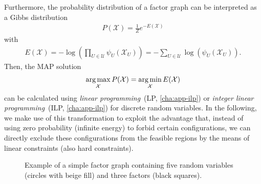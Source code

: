 Furthermore, the probability distribution of a factor graph can be interpreted as a Gibbs
distribution
\begin{align}
    \label{fg-gibbs}
    P(\mathcal{X}) = \frac{1}{Z}e^{-E(\mathcal{X})}
\end{align}
with
\begin{align}
    E(\mathcal{X}) = -\log\left(\prod_{U \in \mathcal{U}}\psi_U(\mathcal{X}_U)\right) = -\sum_{U \in \mathcal{U}}\log\left(\psi_U(\mathcal{X}_U)\right).
\end{align}
Then, the MAP solution
\begin{align}
    \label{fg-map}
    \argmax_{\mathcal{X}}P(\mathcal{X}) = \argmin_{\mathcal{X}}E(\mathcal{X})
\end{align}
can be calculated using \emph{linear programming}~(LP, \cref{cha:app-ilp}) or \emph{integer linear
    programming}~(ILP, \cref{cha:app-ilp}) for discrete random
variables. In the following, we make use of this transformation to exploit the advantage that,
instead of using zero probability (infinite energy) to forbid certain configurations, we can
directly exclude these configurations from the feasible regions by the means of linear constraints
(also hard constraints).





\begin{figure}
    \centering
    \begin{tikzpicture}[thick, on grid, every node/.style={font=\small, scale=1.5}]
        
    \end{tikzpicture}
    \caption[Example of a simple factor graph]{Example of a simple factor graph containing five
        random variables (circles with beige fill) and three factors (black squares).}
    \label{fig:fg-simple}
\end{figure}




